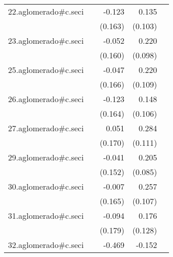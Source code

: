 {\begin{longtable}{l*{4}{D{.}{.}{-1}}}
\addlinespace
22.aglomerado#c.seci&                     &      -0.123         &       0.135         &                     \\
            &                     &     (0.163)         &     (0.103)         &                     \\
\addlinespace
23.aglomerado#c.seci&                     &      -0.052         &       0.220\sym{*}  &                     \\
            &                     &     (0.160)         &     (0.098)         &                     \\
\addlinespace
25.aglomerado#c.seci&                     &      -0.047         &       0.220\sym{*}  &                     \\
            &                     &     (0.166)         &     (0.109)         &                     \\
\addlinespace
26.aglomerado#c.seci&                     &      -0.123         &       0.148         &                     \\
            &                     &     (0.164)         &     (0.106)         &                     \\
\addlinespace
27.aglomerado#c.seci&                     &       0.051         &       0.284\sym{*}  &                     \\
            &                     &     (0.170)         &     (0.111)         &                     \\
\addlinespace
29.aglomerado#c.seci&                     &      -0.041         &       0.205\sym{*}  &                     \\
            &                     &     (0.152)         &     (0.085)         &                     \\
\addlinespace
30.aglomerado#c.seci&                     &      -0.007         &       0.257\sym{*}  &                     \\
            &                     &     (0.165)         &     (0.107)         &                     \\
\addlinespace
31.aglomerado#c.seci&                     &      -0.094         &       0.176         &                     \\
            &                     &     (0.179)         &     (0.128)         &                     \\
\addlinespace
32.aglomerado#c.seci&                     &      -0.469\sym{**} &      -0.152         &                     \\

\end{longtable}}

